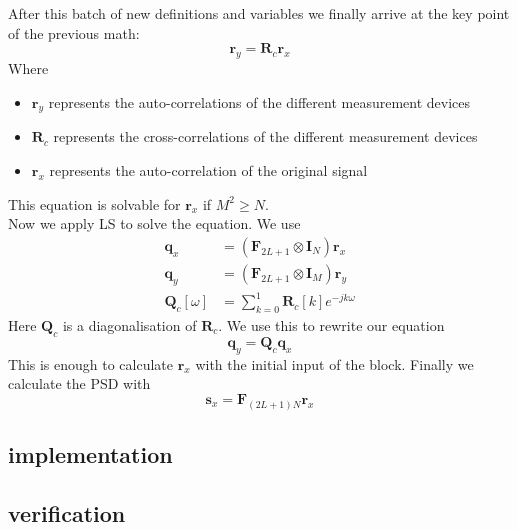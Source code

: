 \documentclass[report, oneside, a4paper, openany]{memoir}
\begin{document}
After this batch of new definitions and variables we finally arrive at the key point of the previous math:
$$
\mathbf{r}_y = \mathbf{R}_c\mathbf{r}_x
$$ 
Where
\begin{itemize}
\item $\mathbf{r}_y$ represents the auto-correlations of the different measurement devices
\item $\mathbf{R}_c$ represents the cross-correlations of the different measurement devices 
\item $\mathbf{r}_x$ represents the auto-correlation of the original signal
\end{itemize}
This equation is solvable for $\mathbf{r}_x$ if $M^2\geq N$. \\
Now we apply LS to solve the equation. We use
\begin{equation*}
\begin{split}
\mathbf{q}_x &= (\mathbf{F}_{2L+1}\otimes \mathbf{I}_N)\mathbf{r}_x \\
\mathbf{q}_y &= (\mathbf{F}_{2L+1}\otimes \mathbf{I}_M)\mathbf{r}_y \\
\mathbf{Q}_c[\omega] &= \sum_{k=0}^1\mathbf{R}_c[k]e^{-jk\omega}
\end{split}
\end{equation*}
Here $\mathbf{Q}_c$ is a diagonalisation of $\mathbf{R}_c$. We use this to rewrite our equation
$$
\mathbf{q}_y = \mathbf{Q}_c\mathbf{q}_x
$$
This is enough to calculate $\mathbf{r}_x$ with the initial input of the block. Finally we calculate the PSD with
$$
\mathbf{s}_x = \mathbf{F}_{(2L+1)N}\mathbf{r}_x
$$ 




\subsection{implementation}

\subsection{verification}
\end{document}
